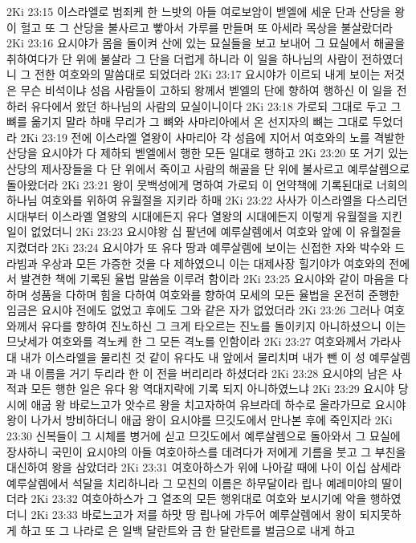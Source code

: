 2Ki 23:15  이스라엘로 범죄케 한 느밧의 아들 여로보암이 벧엘에 세운 단과 산당을 왕이 헐고 또 그 산당을 불사르고 빻아서 가루를 만들며 또 아세라 목상을 불살랐더라
2Ki 23:16  요시야가 몸을 돌이켜 산에 있는 묘실들을 보고 보내어 그 묘실에서 해골을 취하여다가 단 위에 불살라 그 단을 더럽게 하니라 이 일을 하나님의 사람이 전하였더니 그 전한 여호와의 말씀대로 되었더라
2Ki 23:17  요시야가 이르되 내게 보이는 저것은 무슨 비석이냐 성읍 사람들이 고하되 왕께서 벧엘의 단에 향하여 행하신 이 일을 전하러 유다에서 왔던 하나님의 사람의 묘실이니이다
2Ki 23:18  가로되 그대로 두고 그 뼈를 옮기지 말라 하매 무리가 그 뼈와 사마리아에서 온 선지자의 뼈는 그대로 두었더라
2Ki 23:19  전에 이스라엘 열왕이 사마리아 각 성읍에 지어서 여호와의 노를 격발한 산당을 요시야가 다 제하되 벧엘에서 행한 모든 일대로 행하고
2Ki 23:20  또 거기 있는 산당의 제사장들을 다 단 위에서 죽이고 사람의 해골을 단 위에 불사르고 예루살렘으로 돌아왔더라
2Ki 23:21  왕이 뭇백성에게 명하여 가로되 이 언약책에 기록된대로 너희의 하나님 여호와를 위하여 유월절을 지키라 하매
2Ki 23:22  사사가 이스라엘을 다스리던 시대부터 이스라엘 열왕의 시대에든지 유다 열왕의 시대에든지 이렇게 유월절을 지킨 일이 없었더니
2Ki 23:23  요시야왕 십 팔년에 예루살렘에서 여호와 앞에 이 유월절을 지켰더라
2Ki 23:24  요시야가 또 유다 땅과 예루살렘에 보이는 신접한 자와 박수와 드라빔과 우상과 모든 가증한 것을 다 제하였으니 이는 대제사장 힐기야가 여호와의 전에서 발견한 책에 기록된 율법 말씀을 이루려 함이라
2Ki 23:25  요시야와 같이 마음을 다하며 성품을 다하며 힘을 다하여 여호와를 향하여 모세의 모든 율법을 온전히 준행한 임금은 요시야 전에도 없었고 후에도 그와 같은 자가 없었더라
2Ki 23:26  그러나 여호와께서 유다를 향하여 진노하신 그 크게 타오르는 진노를 돌이키지 아니하셨으니 이는 므낫세가 여호와를 격노케 한 그 모든 격노를 인함이라
2Ki 23:27  여호와께서 가라사대 내가 이스라엘을 물리친 것 같이 유다도 내 앞에서 물리치며 내가 뺀 이 성 예루살렘과 내 이름을 거기 두리라 한 이 전을 버리리라 하셨더라
2Ki 23:28  요시야의 남은 사적과 모든 행한 일은 유다 왕 역대지략에 기록 되지 아니하였느냐
2Ki 23:29  요시야 당시에 애굽 왕 바로느고가 앗수르 왕을 치고자하여 유브라데 하수로 올라가므로 요시야 왕이 나가서 방비하더니 애굽 왕이 요시야를 므깃도에서 만나본 후에 죽인지라
2Ki 23:30  신복들이 그 시체를 병거에 싣고 므깃도에서 예루살렘으로 돌아와서 그 묘실에 장사하니 국민이 요시야의 아들 여호아하스를 데려다가 저에게 기름을 붓고 그 부친을 대신하여 왕을 삼았더라
2Ki 23:31  여호아하스가 위에 나아갈 때에 나이 이십 삼세라 예루살렘에서 석달을 치리하니라 그 모친의 이름은 하무달이라 립나 예레미야의 딸이더라
2Ki 23:32  여호아하스가 그 열조의 모든 행위대로 여호와 보시기에 악을 행하였더니
2Ki 23:33  바로느고가 저를 하맛 땅 립나에 가두어 예루살렘에서 왕이 되지못하게 하고 또 그 나라로 은 일백 달란트와 금 한 달란트를 벌금으로 내게 하고

